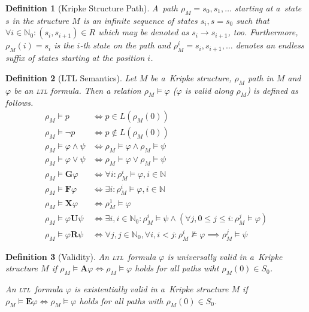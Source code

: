 \documentclass[12pt,oneside,draft]{fithesis}
\newcommand{\ltl}{\textsc{ltl}~}
\newcommand{\mNatural}{\mathbb{N}}
\newcommand{\bF}{\mathbf{F}}
\newcommand{\bG}{\mathbf{G}}
\newcommand{\bX}{\mathbf{X}}
\newcommand{\bU}{\mathbf{U}}
\newcommand{\bR}{\mathbf{R}}
\newcommand{\bA}{\mathbf{A}}
\newcommand{\bE}{\mathbf{E}}
\newtheorem{mydef}{Definition}
\begin{document}
\begin{mydef}[Kripke Structure Path]
A~path\cite{biere} $\rho_M=s_0,s_1,\dotsc$ starting at a~state
$s$ in the structure $M$ is an infinite sequence of states
$s_i, s = s_0$ such that
$\forall i \in \mNatural_0: (s_i, s_{i+1}) \in R$ which may be denoted
as $s_i\rightarrow s_{i+1}$, too. 
Furthermore, $\rho_M(i)=s_i$ is the $i$-th state on the path and
$\rho_M^i=s_i,s_{i+1},\dotsc$ denotes an endless suffix of states
starting at the position $i$.
\end{mydef}

\begin{mydef}[LTL Semantics]
Let $M$ be a~Kripke structure, $\rho_M$ path in $M$ and $\varphi$ be
an \textsc{ltl} formula. Then a relation $\rho_M\models\varphi$
($\varphi$ is valid along $\rho_M$) is defined as follows\cite{clarke}.
\begin{align}
	\rho_M\models p&\iff p\in L(\rho_M(0))\\
	\rho_M\models\neg p&\iff p\notin L(\rho_M(0))\\
	\rho_M\models \varphi\wedge\psi&\iff\rho_M\models\varphi\wedge
		\rho_M\models\psi\\
	\rho_M\models \varphi\vee\psi&\iff\rho_M\models\varphi\vee
		\rho_M\models\psi\\
	\rho_M\models\bG\varphi&\iff\forall i:\rho_M^i\models\varphi,
		i\in\mNatural\\
	\rho_M\models\bF\varphi&\iff\exists i:\rho_M^i\models\varphi,
		i\in\mNatural\\
	\rho_M\models\bX\varphi&\iff\rho_M^1\models\varphi\\
	\rho_M\models\varphi\bU\psi&\iff\exists i,i\in\mNatural_0:
		\rho_M^i\models\psi\wedge(\forall j,0\leq j\leq i:
			\rho_M^j\models\varphi)\\
	\rho_M\models\varphi\bR\psi&\iff\forall j,j\in\mNatural_0,
		\forall i,i<j:\rho_M^i\not\models\varphi\implies
			\rho_M^j\models\psi
\end{align}
\end{mydef}

\begin{mydef}[Validity]
An \ltl formula $\varphi$ is universally valid in a~Kripke structure $M$
if $\rho_M\models\bA\varphi\iff\rho_M\models\varphi$ holds for all
paths wiht $\rho_M(0)\in S_0$.

An \ltl formula $\varphi$ is existentially valid in a~Kripke structure
$M$ if $\rho_M\models\bE\varphi\iff\rho_M\models\varphi$ holds for all
paths with $\rho_M(0)\in S_0$\cite{biere}.
\end{mydef}
\end{document}
